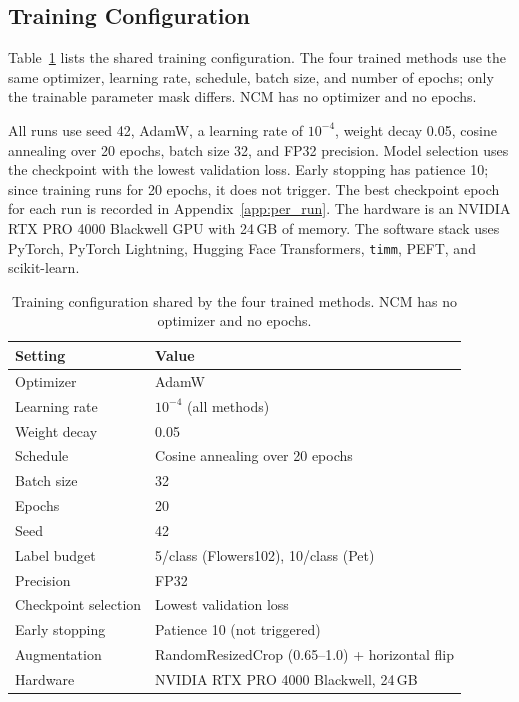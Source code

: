 \documentclass[journal,11pt]{IEEEtran}
\begin{document}
\subsection{Training Configuration}
Table~\ref{tab:config} lists the shared training configuration. The four trained methods use the same optimizer, learning rate, schedule, batch size, and number of epochs; only the trainable parameter mask differs. NCM has no optimizer and no epochs.

All runs use seed 42, AdamW, a learning rate of $10^{-4}$, weight decay 0.05, cosine annealing over 20 epochs, batch size 32, and FP32 precision. Model selection uses the checkpoint with the lowest validation loss. Early stopping has patience 10; since training runs for 20 epochs, it does not trigger. The best checkpoint epoch for each run is recorded in Appendix~\ref{app:per_run}. The hardware is an NVIDIA RTX PRO 4000 Blackwell GPU with 24\,GB of memory. The software stack uses PyTorch, PyTorch Lightning, Hugging Face Transformers, \texttt{timm}, PEFT, and scikit-learn.

\begin{table}[!htbp]
\caption{Training configuration shared by the four trained methods. NCM has no optimizer and no epochs.}
\label{tab:config}
\centering
\small
\setlength{\tabcolsep}{4pt}
\begin{tabular}{@{}p{4.0cm}p{11.0cm}@{}}
\toprule
\textbf{Setting} & \textbf{Value} \\
\midrule
Optimizer & AdamW \\
Learning rate & $10^{-4}$ (all methods) \\
Weight decay & 0.05 \\
Schedule & Cosine annealing over 20 epochs \\
Batch size & 32 \\
Epochs & 20 \\
Seed & 42 \\
Label budget & 5/class (Flowers102), 10/class (Pet) \\
Precision & FP32 \\
Checkpoint selection & Lowest validation loss \\
Early stopping & Patience 10 (not triggered) \\
Augmentation & RandomResizedCrop (0.65--1.0) + horizontal flip \\
Hardware & NVIDIA RTX PRO 4000 Blackwell, 24\,GB \\
\bottomrule
\end{tabular}
\end{table}
\end{document}
